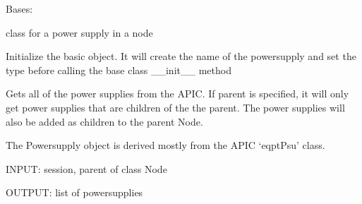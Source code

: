 \documentclass[letterpaper,10pt,english]{sphinxmanual}
\begin{document}

\begin{fulllineitems}
\label{aciphysobject:aciphysobject.Powersupply}
Bases: {\hyperref[aciphysobject:aciphysobject.BaseACIPhysModule]{}}

class for a power supply in a node

Initialize the basic object.  It will create the name of the powersupply and set the type
before calling the base class \_\_init\_\_ method

\begin{fulllineitems}
\label{aciphysobject:aciphysobject.Powersupply.get}
Gets all of the power supplies from the APIC.  If parent is specified, it will only get power supplies that are
children of the the parent.  The power supplies will also be added as children to the parent Node.

The Powersupply object is derived mostly from the APIC `eqptPsu' class.

INPUT: session, parent of class Node

OUTPUT: list of powersupplies

\end{fulllineitems}


\begin{fulllineitems}
\label{aciphysobject:aciphysobject.Powersupply.populate_children}
\end{fulllineitems}


\end{fulllineitems}

\end{document}
